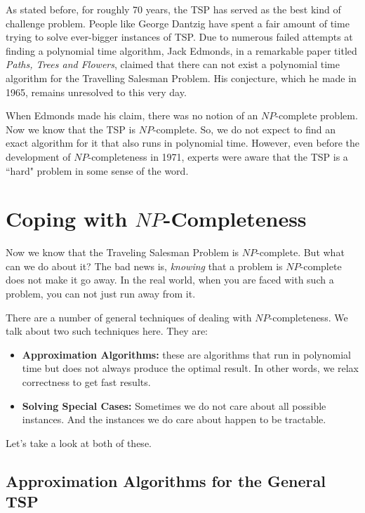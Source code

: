 \documentclass[12pt]{article}
\begin{document}
As stated before, for roughly 70 years, the TSP has served as the best kind of challenge problem. People like George Dantzig have spent a fair amount of time trying to solve ever-bigger instances of TSP. Due to numerous failed attempts at finding a polynomial time algorithm, Jack Edmonds, in a remarkable paper titled \textit{Paths, Trees and Flowers}, claimed that there can not exist a polynomial time algorithm for the Travelling Salesman Problem. His conjecture, which he made in 1965, remains unresolved to this very day.

When Edmonds made his claim, there was no notion of an \(NP\)-complete problem. Now we know that the TSP is \(NP\)-complete. So, we do not expect to find an exact algorithm for it that also runs in polynomial time. However, even before the development of \(NP\)-completeness in 1971, experts were aware that the TSP is a ``hard" problem in some sense of the word.

\section{Coping with \(NP\)-Completeness}

Now we know that the Traveling Salesman Problem is \(NP\)-complete. But what can we do about it? The bad news is, \textit{knowing} that a problem is \(NP\)-complete does not make it go away. In the real world, when you are faced with such a problem, you can not just run away from it.

There are a number of general techniques of dealing with \(NP\)-completeness. We talk about two such techniques here. They are:

\begin{itemize}
    \item \textbf{Approximation Algorithms:} these are algorithms that run in polynomial time but does not always produce the optimal result. In other words, we relax correctness to get fast results.
    
    \item \textbf{Solving Special Cases:} Sometimes we do not care about all possible instances. And the instances we do care about happen to be tractable. 
\end{itemize}

Let's take a look at both of these.

\subsection{Approximation Algorithms for the General TSP}
\end{document}
